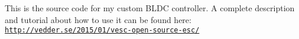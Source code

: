 This is the source code for my custom B\+L\+D\+C controller. A complete description and tutorial about how to use it can be found here\+: \href{http://vedder.se/2015/01/vesc-open-source-esc/}{\tt http\+://vedder.\+se/2015/01/vesc-\/open-\/source-\/esc/} 